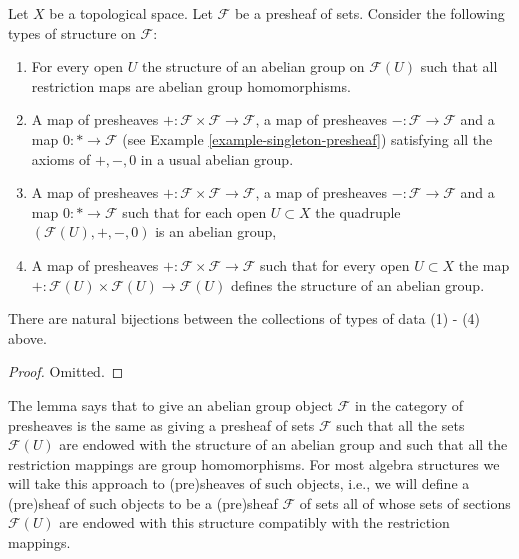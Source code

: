 \begin{lemma}
\label{lemma-abelian-presheaves}
Let $X$ be a topological space.
Let $\mathcal{F}$ be a presheaf of sets.
Consider the following types of structure on $\mathcal{F}$:
\begin{enumerate}
\item For every open $U$ the structure of an abelian group
on $\mathcal{F}(U)$ such that all restriction maps are
abelian group homomorphisms.
\item A map of presheaves
$+ : \mathcal{F} \times \mathcal{F} \to \mathcal{F}$,
a map of presheaves $- : \mathcal{F} \to \mathcal{F}$
and a map $0 : * \to \mathcal{F}$
(see Example \ref{example-singleton-presheaf})
satisfying all the axioms of $+, -, 0$ in a usual
abelian group.
\item A map of presheaves
$+ : \mathcal{F} \times \mathcal{F} \to \mathcal{F}$,
a map of presheaves $- : \mathcal{F} \to \mathcal{F}$
and a map $0 : * \to \mathcal{F}$
such that for each open $U \subset X$ the quadruple
$(\mathcal{F}(U), +, -, 0)$ is an abelian group,
\item A map of presheaves $+ : \mathcal{F} \times \mathcal{F}
\to \mathcal{F}$ such that for every open $U \subset X$
the map $+ : \mathcal{F}(U) \times \mathcal{F}(U) \to \mathcal{F}(U)$
defines the structure of an abelian group.
\end{enumerate}
There are natural bijections between the collections of
types of data (1) - (4) above.
\end{lemma}

\begin{proof}
Omitted.
\end{proof}

\noindent
The lemma says that to give an abelian group object $\mathcal{F}$
in the category of presheaves is the same as giving a presheaf of sets
$\mathcal{F}$ such that all the sets $\mathcal{F}(U)$ are endowed
with the structure of an abelian group and such that all the restriction
mappings are group homomorphisms. For most algebra structures
we will take this approach to (pre)sheaves of such objects, i.e.,
we will define a (pre)sheaf of such objects to be a (pre)sheaf
$\mathcal{F}$ of sets all of whose sets of sections $\mathcal{F}(U)$
are endowed with this structure compatibly with the restriction
mappings.

